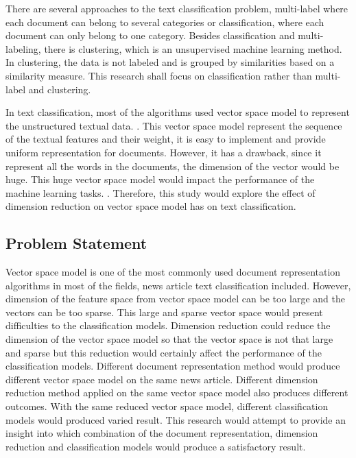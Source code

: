 There are several approaches to the text classification problem, multi-label where each document can belong to several categories or classification, where each document can only belong to one category. Besides classification and multi-labeling, there is clustering, which is an unsupervised machine learning method. In clustering, the data is not labeled and is grouped by similarities based on a similarity measure. This research shall focus on classification rather than multi-label and clustering.

In text classification, most of the algorithms used vector space model to represent the unstructured textual data. \cite{vectorSpaceModelText}. This vector space model represent the sequence of the textual features and their weight, it is easy to implement and provide uniform representation for documents. However, it has a drawback, since it represent all the words in the documents, the dimension of the vector would be huge. This huge vector space model would impact the performance of the machine learning tasks. \cite{knnVectorSpaceReduction}. Therefore, this study would explore the effect of dimension reduction on vector space model has on text classification.\\

\subsection{Problem Statement}
Vector space model is one of the most commonly used document representation algorithms in most of the fields, news article text classification included. However, dimension of the feature space from vector space model can be too large and the vectors can be too sparse. This large and sparse vector space would present difficulties to the classification models. Dimension reduction could reduce the dimension of the vector space model so that the vector space is not that large and sparse but this reduction would certainly affect the performance of the classification models. Different document representation method would produce different vector space model on the same news article. Different dimension reduction method applied on the same vector space model also produces different outcomes. With the same reduced vector space model, different classification models would produced varied result. This research would attempt to provide an insight into which combination of the document representation, dimension reduction and classification models would produce a satisfactory result.\\

